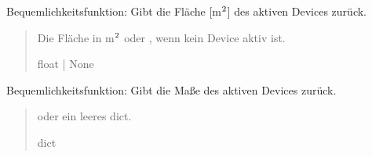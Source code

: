 \documentclass[letterpaper,10pt,english]{sphinxmanual}
\begin{document}
\begin{fulllineitems}
\begin{fulllineitems}
\end{fulllineitems}


\begin{fulllineitems}
\label{\detokenize{modulab/device_manager:modules.device.DeviceManager.DeviceManager.get_active_device_area}}
\pysigstartsignatures
\pysiglinewithargsret
{}
{}
{}
\pysigstopsignatures
\sphinxAtStartPar
Bequemlichkeitsfunktion: Gibt die Fläche {[}m\(\sp{\text{2}}\){]} des aktiven Devices zurück.
\begin{quote}\begin{description}
\sphinxAtStartPar
Die Fläche in m\(\sp{\text{2}}\) oder , wenn kein Device aktiv ist.

\sphinxAtStartPar
float | None

\end{description}\end{quote}

\end{fulllineitems}


\begin{fulllineitems}
\label{\detokenize{modulab/device_manager:modules.device.DeviceManager.DeviceManager.get_active_device_dimensions}}
\pysigstartsignatures
\pysiglinewithargsret
{}
{}
{}
\pysigstopsignatures
\sphinxAtStartPar
Bequemlichkeitsfunktion: Gibt die Maße des aktiven Devices zurück.
\begin{quote}\begin{description}
\sphinxAtStartPar
\begin{description}
\sphinxAtStartPar
oder ein leeres dict.

\end{description}


\sphinxAtStartPar
dict

\end{description}\end{quote}

\end{fulllineitems}


\end{fulllineitems}
\end{document}
